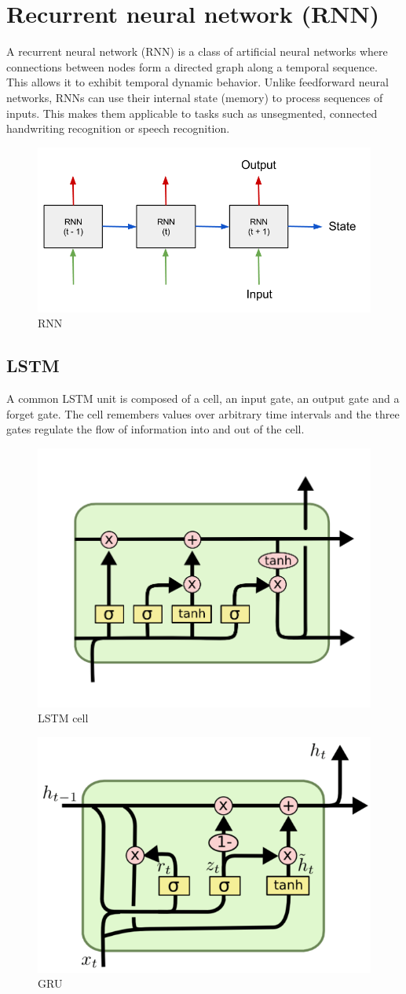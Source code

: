 \documentclass[10pt]{SelfArx} %
\begin{document}
	\section{Recurrent neural network (RNN)}
	A recurrent neural network (RNN) is a class of artificial neural networks where connections between nodes form a directed graph along a temporal sequence. This allows it to exhibit temporal dynamic behavior. Unlike feedforward neural networks, RNNs can use their internal state (memory) to process sequences of inputs. This makes them applicable to tasks such as unsegmented, connected handwriting recognition or speech recognition.
	\begin{figure}\centering 
		\includegraphics[width=.6\linewidth]{img/rnn}
		\caption{RNN}
	\end{figure}

	\subsection{LSTM}
	A common LSTM unit is composed of a cell, an input gate, an output gate and a forget gate. The cell remembers values over arbitrary time intervals and the three gates regulate the flow of information into and out of the cell.
	\begin{figure}\centering 
		\includegraphics[width=.6\linewidth]{img/lstm}
		\caption{LSTM cell}
	\end{figure}
\begin{figure}\centering 
	\includegraphics[width=.6\linewidth]{img/gru}
	\caption{GRU}
\end{figure}
\end{document}
